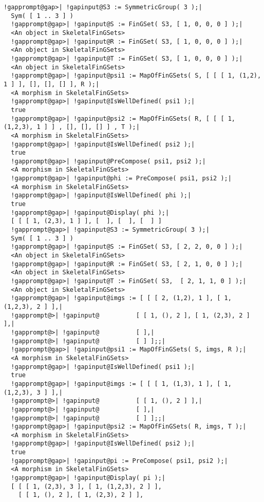 \documentclass[a4paper,11pt]{report}
\begin{document}
{{{\begin{Verbatim}[commandchars=!@|,fontsize=\small,frame=single,label=Example]
  !gapprompt@gap>| !gapinput@S3 := SymmetricGroup( 3 );|
  Sym( [ 1 .. 3 ] )
  !gapprompt@gap>| !gapinput@S := FinGSet( S3, [ 1, 0, 0, 0 ] );|
  <An object in SkeletalFinGSets>
  !gapprompt@gap>| !gapinput@R := FinGSet( S3, [ 1, 0, 0, 0 ] );|
  <An object in SkeletalFinGSets>
  !gapprompt@gap>| !gapinput@T := FinGSet( S3, [ 1, 0, 0, 0 ] );|
  <An object in SkeletalFinGSets>
  !gapprompt@gap>| !gapinput@psi1 := MapOfFinGSets( S, [ [ [ 1, (1,2), 1 ] ], [], [], [] ], R );|
  <A morphism in SkeletalFinGSets>
  !gapprompt@gap>| !gapinput@IsWellDefined( psi1 );|
  true
  !gapprompt@gap>| !gapinput@psi2 := MapOfFinGSets( R, [ [ [ 1, (1,2,3), 1 ] ] , [], [], [] ] , T );|
  <A morphism in SkeletalFinGSets>
  !gapprompt@gap>| !gapinput@IsWellDefined( psi2 );|
  true
  !gapprompt@gap>| !gapinput@PreCompose( psi1, psi2 );|
  <A morphism in SkeletalFinGSets>
  !gapprompt@gap>| !gapinput@phi := PreCompose( psi1, psi2 );|
  <A morphism in SkeletalFinGSets>
  !gapprompt@gap>| !gapinput@IsWellDefined( phi );|
  true
  !gapprompt@gap>| !gapinput@Display( phi );|
  [ [ [ 1, (2,3), 1 ] ], [  ], [  ], [  ] ]
  !gapprompt@gap>| !gapinput@S3 := SymmetricGroup( 3 );|
  Sym( [ 1 .. 3 ] )
  !gapprompt@gap>| !gapinput@S := FinGSet( S3, [ 2, 2, 0, 0 ] );|
  <An object in SkeletalFinGSets>
  !gapprompt@gap>| !gapinput@R := FinGSet( S3, [ 2, 1, 0, 0 ] );|
  <An object in SkeletalFinGSets>
  !gapprompt@gap>| !gapinput@T := FinGSet( S3,  [ 2, 1, 1, 0 ] );|
  <An object in SkeletalFinGSets>
  !gapprompt@gap>| !gapinput@imgs := [ [ [ 2, (1,2), 1 ], [ 1, (1,2,3), 2 ] ],|
  !gapprompt@>| !gapinput@          [ [ 1, (), 2 ], [ 1, (2,3), 2 ] ],|
  !gapprompt@>| !gapinput@          [ ],|
  !gapprompt@>| !gapinput@          [ ] ];;|
  !gapprompt@gap>| !gapinput@psi1 := MapOfFinGSets( S, imgs, R );|
  <A morphism in SkeletalFinGSets>
  !gapprompt@gap>| !gapinput@IsWellDefined( psi1 );|
  true
  !gapprompt@gap>| !gapinput@imgs := [ [ [ 1, (1,3), 1 ], [ 1, (1,2,3), 3 ] ],|
  !gapprompt@>| !gapinput@          [ [ 1, (), 2 ] ],|
  !gapprompt@>| !gapinput@          [ ],|
  !gapprompt@>| !gapinput@          [ ] ];;|
  !gapprompt@gap>| !gapinput@psi2 := MapOfFinGSets( R, imgs, T );|
  <A morphism in SkeletalFinGSets>
  !gapprompt@gap>| !gapinput@IsWellDefined( psi2 );|
  true
  !gapprompt@gap>| !gapinput@pi := PreCompose( psi1, psi2 );|
  <A morphism in SkeletalFinGSets>
  !gapprompt@gap>| !gapinput@Display( pi );|
  [ [ [ 1, (2,3), 3 ], [ 1, (1,2,3), 2 ] ],
    [ [ 1, (), 2 ], [ 1, (2,3), 2 ] ],

\end{Verbatim}}}}
\end{document}
